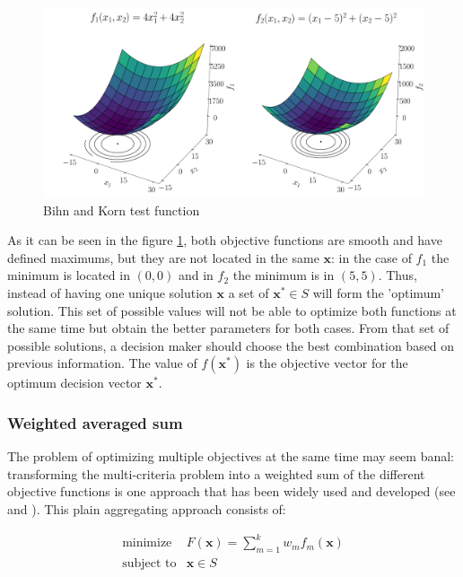     \begin{figure}[h!]
        \centering
        \includegraphics[width=\textwidth]{Figures/2/BK2.pdf}
        \caption{Bihn and Korn test function}
        \label{fig:BihnKorn}
    \end{figure}
    
    As it can be seen in the figure \ref{fig:BihnKorn}, both objective functions are smooth and have defined maximums, but they are not located in the same $\bm{x}$: in the case of $f_1$ the minimum is located in $(0,0)$ and in $f_2$ the minimum is in $(5,5)$. Thus, instead of having one unique solution $\bm{x}$ a set of $\bm{x^*} \in S$ will form the 'optimum' solution. This set of possible values will not be able to optimize both functions at the same time but obtain the better parameters for both cases. From that set of possible solutions, a decision maker should choose the best combination based on previous information. The value of $f(\bm{x^*})$ is the objective vector for the optimum decision vector $\bm{x^*}$.

\subsubsection*{Weighted averaged sum}

    The problem of optimizing multiple objectives at the same time may seem banal: transforming the multi-criteria problem into a weighted sum of the different objective functions is one approach that has been widely used and developed (see \cite{stanimirovic2011linear} and \cite{kim2006adaptive}). This plain aggregating approach consists of:
    
    \begin{equation}
        \begin{array}{cl}
            \textrm{minimize} & F(\bm{x}) = \displaystyle \sum_{m=1}^{k}  w_m f_m(\bm{x}) \\
            \textrm{subject to} & \bm{x} \in S
        \end{array}
        \label{eq:weightedSum}
    \end{equation}
    
